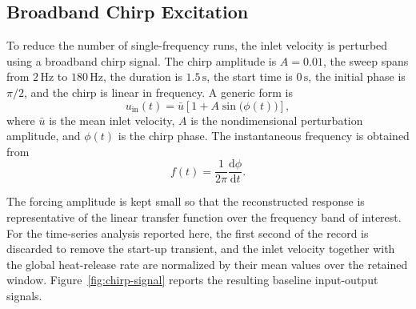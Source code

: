 \documentclass{iopconfser}
\begin{document}
\subsection{Broadband Chirp Excitation}
\label{subsec:chirp}

To reduce the number of single-frequency runs, the inlet velocity is perturbed using a broadband chirp signal. The chirp amplitude is $A=0.01$, the sweep spans from $2\,\mathrm{Hz}$ to $180\,\mathrm{Hz}$, the duration is $1.5\,\mathrm{s}$, the start time is $0\,\mathrm{s}$, the initial phase is $\pi/2$, and the chirp is linear in frequency. A generic form is
\begin{equation}
  u_{\mathrm{in}}(t) = \bar{u}\left[1 + A \sin\bigl(\phi(t)\bigr)\right],
  \label{eq:inlet-chirp}
\end{equation}
where $\bar{u}$ is the mean inlet velocity, $A$ is the nondimensional perturbation amplitude, and $\phi(t)$ is the chirp phase. The instantaneous frequency is obtained from
\begin{equation}
  f(t) = \frac{1}{2\pi}\frac{\mathrm{d}\phi}{\mathrm{d}t}.
  \label{eq:instantaneous-frequency}
\end{equation}

The forcing amplitude is kept small so that the reconstructed response is representative of the linear transfer function over the frequency band of interest. For the time-series analysis reported here, the first second of the record is discarded to remove the start-up transient, and the inlet velocity together with the global heat-release rate are normalized by their mean values over the retained window. Figure~\ref{fig:chirp-signal} reports the resulting baseline input-output signals.
\end{document}
